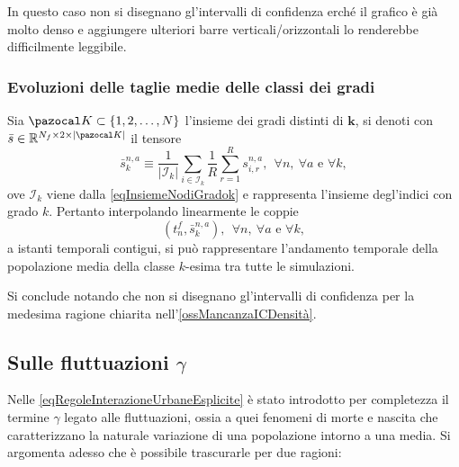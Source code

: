                 \begin{oss}
                    \label{ossMancanzaICDensità}
                    In questo caso non si disegnano gl'intervalli di confidenza erché il grafico è già molto denso e aggiungere ulteriori barre verticali/orizzontali lo renderebbe difficilmente leggibile.
                \end{oss}
        
            \subsubsection{Evoluzioni delle taglie medie delle classi dei gradi}

                Sia \(\pazocal K\subset\{1,2,\ldots,N\}\) l'insieme dei gradi distinti di \(\mathbf k\), si denoti con \(\bar s\in\mathbb R^{N_f\times2\times\vert\pazocal K\vert}\) il tensore
                \begin{equation*}
                    \bar s^{n,a}_k\equiv
                    \frac1{\vert\mathcal I_k\vert}\sum_{i\in\mathcal I_k}
                    \frac1R\sum_{r=1}^Rs^{n,a}_{i,r},
                    \ \ \forall n,\ \forall a\text{ e }\forall k,
                \end{equation*}
                ove \(\mathcal I_k\) viene dalla \cref{eqInsiemeNodiGradok} e rappresenta l'insieme degl'indici con grado \(k\). Pertanto interpolando linearmente le coppie
                \begin{equation*}
                    \left(t^f_n,\bar s^{n,a}_k\right),
                    \ \ \forall n,\ \forall a\text{ e }\forall k,
                \end{equation*}
                a istanti temporali contigui, si può rappresentare l'andamento temporale della popolazione media della classe \(k\)-esima tra tutte le simulazioni.
               
                Si conclude notando che non si disegnano gl'intervalli di confidenza per la medesima ragione chiarita nell'\cref{ossMancanzaICDensità}.
        
        \subsection{Sulle fluttuazioni \texorpdfstring{\(\gamma\)}{γ}}

            Nelle \ref{eqRegoleInterazioneUrbaneEsplicite} è stato introdotto per completezza il termine \(\gamma\) legato alle fluttuazioni, ossia a quei fenomeni di morte e nascita che caratterizzano la naturale variazione di una popolazione intorno a una media. Si argomenta adesso che è possibile trascurarle per due ragioni:

